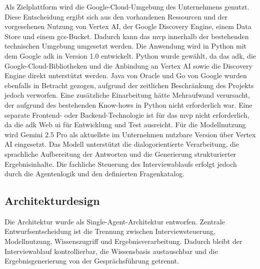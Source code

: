 \documentclass[
  10pt,
  ngerman,
  a4paper,
  toc=graduated,
  numbers=noenddot,
  headings=standardclasses,
  nonumberlist
]{scrartcl}
\begin{document}
Als Zielplattform wird die Google-Cloud-Umgebung des Unternehmens genutzt. Diese Entscheidung ergibt sich aus den vorhandenen Ressourcen und der vorgesehenen Nutzung von Vertex AI, der Google Discovery Engine, einem Data Store und einem \gls{gcs}-Bucket. Dadurch kann das \gls{mvp} innerhalb der bestehenden technischen Umgebung umgesetzt werden. Die Anwendung wird in Python mit dem Google \gls{adk} in Version 1.0 entwickelt. Python wurde gewählt, da das \gls{adk}, die Google-Cloud-Bibliotheken und die Anbindung an Vertex AI sowie die Discovery Engine direkt unterstützt werden. Java von Oracle und Go von Google wurden ebenfalls in Betracht gezogen, aufgrund der zeitlichen Beschränkung des Projekts jedoch verworfen. Eine zusätzliche Einarbeitung hätte Mehraufwand verursacht, der aufgrund des bestehenden Know-hows in Python nicht erforderlich war. Eine separate Frontend- oder Backend-Technologie ist für das \gls{mvp} nicht erforderlich, da die \gls{adk} Web \gls{ui} für Entwicklung und Test ausreicht. Für die Modellnutzung wird Gemini 2.5 Pro als aktuellste im Unternehmen nutzbare Version über Vertex AI eingesetzt. Das Modell unterstützt die dialogorientierte Verarbeitung, die sprachliche Aufbereitung der Antworten und die Generierung strukturierter Ergebnisinhalte. Die fachliche Steuerung des Interviewablaufs erfolgt jedoch durch die Agentenlogik und den definierten Fragenkatalog.

\subsection{Architekturdesign}
\label{architekturdesign}

Die Architektur wurde als Single-Agent-Architektur entworfen. Zentrale Entwurfsentscheidung ist die Trennung zwischen Interviewsteuerung, Modellnutzung, Wissenszugriff und Ergebnisverarbeitung. Dadurch bleibt der Interviewablauf kontrollierbar, die Wissensbasis austauschbar und die Ergebnisgenerierung von der Gesprächsführung getrennt. 
\end{document}
